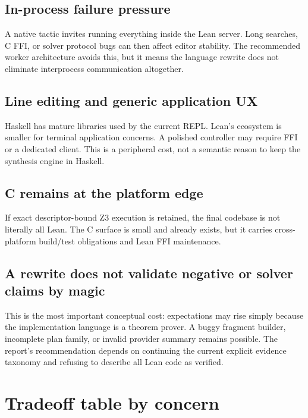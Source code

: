 \documentclass[10pt,letterpaper,oneside]{report}
\begin{document}
\subsection{In-process failure pressure}

A native tactic invites running everything inside the Lean server. Long searches, C FFI, or solver protocol bugs can then affect editor stability. The recommended worker architecture avoids this, but it means the language rewrite does not eliminate interprocess communication altogether.

\subsection{Line editing and generic application UX}

Haskell has mature libraries used by the current REPL. Lean's ecosystem is smaller for terminal application concerns. A polished controller may require FFI or a dedicated client. This is a peripheral cost, not a semantic reason to keep the synthesis engine in Haskell.

\subsection{C remains at the platform edge}

If exact descriptor-bound Z3 execution is retained, the final codebase is not literally all Lean. The C surface is small and already exists, but it carries cross-platform build/test obligations and Lean FFI maintenance.

\subsection{A rewrite does not validate negative or solver claims by magic}

This is the most important conceptual cost: expectations may rise simply because the implementation language is a theorem prover. A buggy fragment builder, incomplete plan family, or invalid provider summary remains possible. The report's recommendation depends on continuing the current explicit evidence taxonomy and refusing to describe all Lean code as verified.

\section{Tradeoff table by concern}
\end{document}
